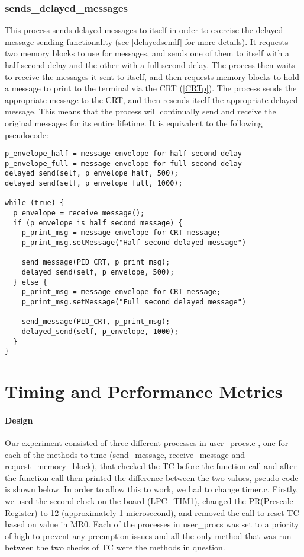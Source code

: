 \documentclass[12pt]{article}
\begin{document}
\subsubsection{sends\_delayed\_messages}\label{sendsdelayedp}
This process sends delayed messages to itself in order to exercise the delayed message sending functionality (see \ref{delayedsendf} for more details). It requests two memory blocks to use for messages, and sends one of them to itself with a half-second delay and the other with a full second delay. The process then waits to receive the messages it sent to itself, and then requests memory blocks to hold a message to print to the terminal via the CRT (\ref{CRTp}). The process sends the appropriate message to the CRT, and then resends itself the appropriate delayed message. This means that the process will continually send and receive the original messages for its entire lifetime. It is equivalent to the following pseudocode:

\begin{lstlisting}[breaklines=true]
p_envelope_half = message envelope for half second delay
p_envelope_full = message envelope for full second delay
delayed_send(self, p_envelope_half, 500);
delayed_send(self, p_envelope_full, 1000);

while (true) {
  p_envelope = receive_message();
  if (p_envelope is half second message) {
    p_print_msg = message envelope for CRT message;
    p_print_msg.setMessage("Half second delayed message")

    send_message(PID_CRT, p_print_msg);
    delayed_send(self, p_envelope, 500);
  } else {
    p_print_msg = message envelope for CRT message;
    p_print_msg.setMessage("Full second delayed message")

    send_message(PID_CRT, p_print_msg);
    delayed_send(self, p_envelope, 1000);
  }
}
\end{lstlisting}



\newpage
\section{Timing and Performance Metrics}\label{metrics}
  \paragraph{Design} Our experiment consisted of three different processes in user\_procs.c , one for each of the methods to time (send\_message, receive\_message and request\_memory\_block), that checked the TC before the function call and after the function call then printed the difference between the two values, pseudo code is shown below. In order to allow this to work, we had to change timer.c. Firstly, we used the second clock on the board (LPC\_TIM1), changed the PR(Prescale Register) to 12 (approximately 1 microsecond), and removed the call to reset TC based on value in MR0. Each of the processes in user\_procs was set to a priority of high to prevent any preemption issues and all the only method that was run between the two checks of TC were the methods in question.
\end{document}
